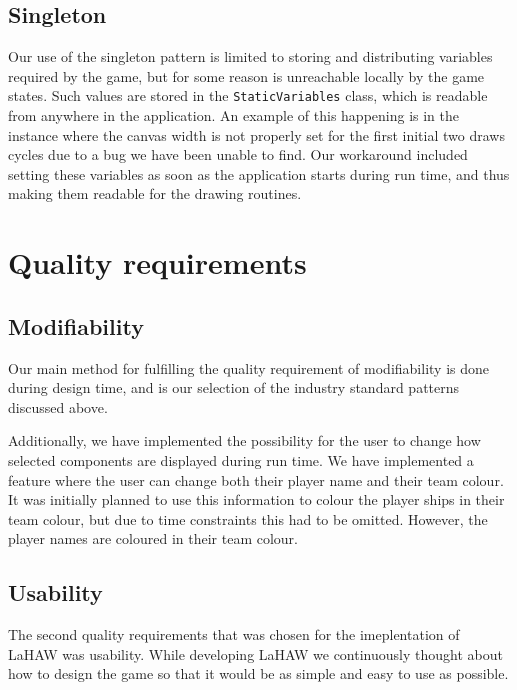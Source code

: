 \subsection{Singleton}


Our use of the singleton pattern is limited to storing and distributing variables required by the game, but for some reason is unreachable locally by the game states. Such values are stored in the \texttt{StaticVariables} class, which is readable from anywhere in the application.
An example of this happening is in the instance where the canvas width is not properly set for the first initial two draws cycles due to a bug we have been unable to find. Our workaround included setting these variables as soon as the application starts during run time, and thus making them readable for the drawing routines.





\section{Quality requirements}

\subsection{Modifiability}
Our main method for fulfilling the quality requirement of modifiability is done during design time, and is our selection of the industry standard patterns discussed above.


Additionally, we have implemented the possibility for the user to change how selected components are displayed during run time.
We have implemented a feature where the user can change both their player name and their team colour. It was initially planned to use this information to colour the player ships in their team colour, but due to time constraints this had to be omitted. However, the player names are coloured in their team colour.



\subsection{Usability}
The second quality requirements that was chosen for the imeplentation of LaHAW was usability. While developing LaHAW we continuously thought about how to design the game so that it would be as simple and easy to use as possible.

